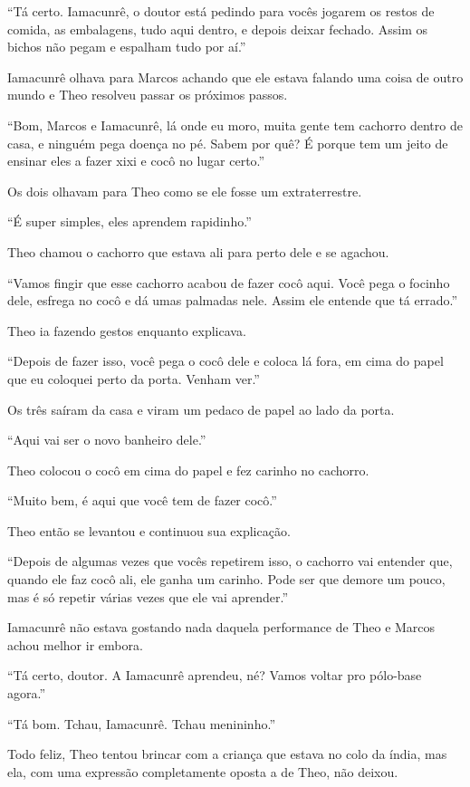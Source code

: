``Tá certo. Iamacunrê, o doutor está pedindo para vocês jogarem os
restos de comida, as embalagens, tudo aqui dentro, e depois deixar
fechado. Assim os bichos não pegam e espalham tudo por aí.''

Iamacunrê olhava para Marcos achando que ele estava falando uma coisa de
outro mundo e Theo resolveu passar os próximos passos.

``Bom, Marcos e Iamacunrê, lá onde eu moro, muita gente tem cachorro
dentro de casa, e ninguém pega doença no pé. Sabem por quê? É porque tem
um jeito de ensinar eles a fazer xixi e cocô no lugar certo.''

Os dois olhavam para Theo como se ele fosse um extraterrestre.

``É super simples, eles aprendem rapidinho.''

Theo chamou o cachorro que estava ali para perto dele e se agachou.

``Vamos fingir que esse cachorro acabou de fazer cocô aqui. Você pega o
focinho dele, esfrega no cocô e dá umas palmadas nele. Assim ele entende
que tá errado.''

Theo ia fazendo gestos enquanto explicava.

``Depois de fazer isso, você pega o cocô dele e coloca lá fora, em cima
do papel que eu coloquei perto da porta. Venham ver.''

Os três saíram da casa e viram um pedaco de papel ao lado da porta.

``Aqui vai ser o novo banheiro dele.''

Theo colocou o cocô em cima do papel e fez carinho no cachorro.

``Muito bem, é aqui que você tem de fazer cocô.''

Theo então se levantou e continuou sua explicação.

``Depois de algumas vezes que vocês repetirem isso, o cachorro vai
entender que, quando ele faz cocô ali, ele ganha um carinho. Pode ser
que demore um pouco, mas é só repetir várias vezes que ele vai
aprender.''

Iamacunrê não estava gostando nada daquela performance de Theo e Marcos
achou melhor ir embora.

``Tá certo, doutor. A Iamacunrê aprendeu, né? Vamos voltar pro pólo-base
agora.''

``Tá bom. Tchau, Iamacunrê. Tchau menininho.''

Todo feliz, Theo tentou brincar com a criança que estava no colo da
índia, mas ela, com uma expressão completamente oposta a de Theo, não
deixou.

